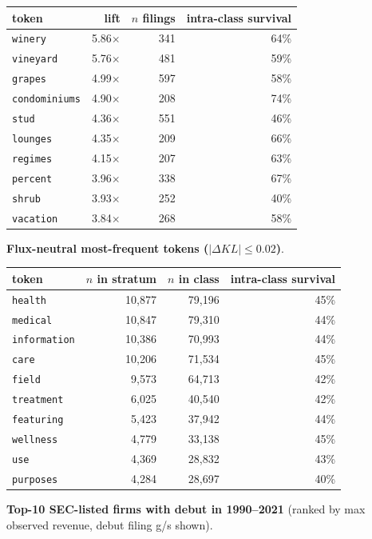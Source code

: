 \begin{tabular}{lrrr}
\toprule
token & lift & $n$ filings & intra-class survival \\
\midrule
\texttt{winery} & 5.86$\times$ & 341 & 64\% \\
\texttt{vineyard} & 5.76$\times$ & 481 & 59\% \\
\texttt{grapes} & 4.99$\times$ & 597 & 58\% \\
\texttt{condominiums} & 4.90$\times$ & 208 & 74\% \\
\texttt{stud} & 4.36$\times$ & 551 & 46\% \\
\texttt{lounges} & 4.35$\times$ & 209 & 66\% \\
\texttt{regimes} & 4.15$\times$ & 207 & 63\% \\
\texttt{percent} & 3.96$\times$ & 338 & 67\% \\
\texttt{shrub} & 3.93$\times$ & 252 & 40\% \\
\texttt{vacation} & 3.84$\times$ & 268 & 58\% \\
\bottomrule
\end{tabular}

\textbf{Flux-neutral most-frequent tokens ($|\Delta KL|\leq 0.02$)}.

\begin{tabular}{lrrr}
\toprule
token & $n$ in stratum & $n$ in class & intra-class survival \\
\midrule
\texttt{health} & 10,877 & 79,196 & 45\% \\
\texttt{medical} & 10,847 & 79,310 & 44\% \\
\texttt{information} & 10,386 & 70,993 & 44\% \\
\texttt{care} & 10,206 & 71,534 & 45\% \\
\texttt{field} & 9,573 & 64,713 & 42\% \\
\texttt{treatment} & 6,025 & 40,540 & 42\% \\
\texttt{featuring} & 5,423 & 37,942 & 44\% \\
\texttt{wellness} & 4,779 & 33,138 & 45\% \\
\texttt{use} & 4,369 & 28,832 & 43\% \\
\texttt{purposes} & 4,284 & 28,697 & 40\% \\
\bottomrule
\end{tabular}

\textbf{Top-10 SEC-listed firms with debut in 1990--2021} (ranked by max observed revenue, debut filing g/s shown).

